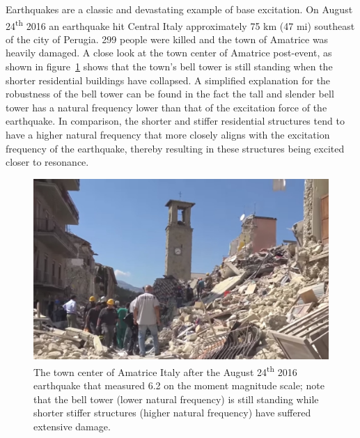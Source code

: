 \documentclass[12pt,letter]{article}
\begin{document}
\begin{vibration_case_study}
			
	Earthquakes are a classic and devastating example of base excitation. On August 24\textsuperscript{th} 2016 an earthquake hit Central Italy approximately 75 km (47 mi) southeast of the city of Perugia. 299 people were killed and the town of Amatrice was heavily damaged. A close look at the town center of Amatrice post-event, as shown in figure~\ref{fig:Italy_2016_earthquake_1} shows that the town's bell tower is still standing when the shorter residential buildings have collapsed. A simplified explanation for the robustness of the bell tower can be found in the fact the tall and slender bell tower has a natural frequency lower than that of the excitation force of the earthquake. In comparison, the shorter and stiffer residential structures tend to have a higher natural frequency that more closely aligns with the excitation frequency of the earthquake, thereby resulting in these structures being excited closer to resonance. 
				
	\begin{figure}[H]
		\centering
		\includegraphics[width=1\textwidth]{../figures/Italy_2016_earthquake_1}
		\caption{The town center of Amatrice Italy after the August 24\textsuperscript{th} 2016 earthquake that measured 6.2  on the moment magnitude scale; note that the bell tower (lower natural frequency) is still standing while shorter stiffer structures (higher natural frequency) have suffered extensive damage. \protect\footnotemark[1] }
		\label{fig:Italy_2016_earthquake_1}
	\end{figure}
	

\end{vibration_case_study}
\end{document}
